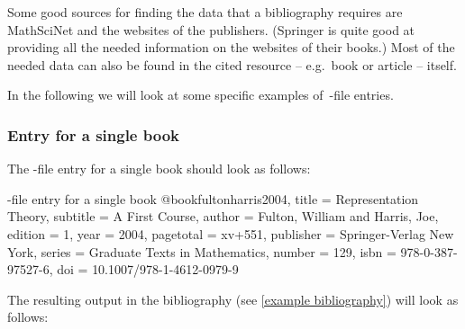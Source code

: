 Some good sources for finding the data that a bibliography requires are MathSciNet and the websites of the publishers.
(Springer is quite good at providing all the needed information on the websites of their books.)
Most of the needed data can also be found in the cited resource -- e.g.\ book or article -- itself.

In the following we will look at some specific examples of~-file entries.

\subsubsection{Entry for a single book}

The -file entry for a single book should look as follows: 
\begin{showcode}[label = {bib entry single book}]{-file entry for a single book}
@book{fultonharris2004,
  title     = {Representation Theory},
  subtitle  = {A First Course},
  author    = {Fulton, William and Harris, Joe},
  edition   = {1},
  year      = {2004},
  pagetotal = {xv+551},
  publisher = {Springer-Verlag New York},
  series    = {Graduate Texts in Mathematics},
  number    = {129},
  isbn      = {978-0-387-97527-6},
  doi       = {10.1007/978-1-4612-0979-9}
}
\end{showcode}
The resulting output in the bibliography (see \cref{example bibliography}) will look as follows:

